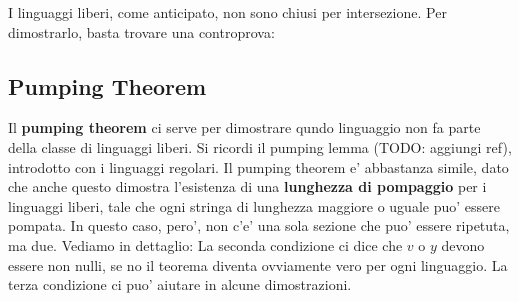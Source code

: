 I linguaggi liberi, come anticipato, non sono chiusi per intersezione. Per dimostrarlo, basta trovare una controprova:
\subsection{Pumping Theorem}
Il \textbf{pumping theorem} ci serve per dimostrare qundo linguaggio non fa parte della classe di linguaggi liberi. Si ricordi il pumping lemma (TODO: aggiungi ref), introdotto con i linguaggi regolari. Il pumping theorem e' abbastanza simile, dato che anche questo dimostra l'esistenza di una \textbf{lunghezza di pompaggio} per i linguaggi liberi, tale che ogni stringa di lunghezza maggiore o uguale puo' essere pompata. In questo caso, pero', non c'e' una sola sezione che puo' essere ripetuta, ma due. Vediamo in dettaglio:
La seconda condizione ci dice che $ v $ o $ y $ devono essere non nulli, se no il teorema diventa ovviamente vero per ogni linguaggio. La terza condizione ci puo' aiutare in alcune dimostrazioni.

